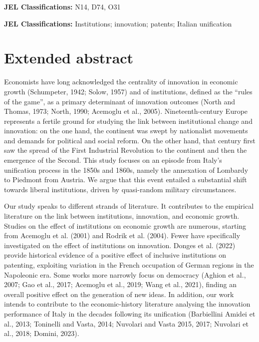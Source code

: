 \textbf{JEL Classifications:} N14, D74, O31 %

\textbf{JEL Classifications:} Institutions; innovation; patents; Italian unification

\clearpage

\section*{Extended abstract}
\noindent Economists have long acknowledged the centrality of innovation in economic growth (Schumpeter, 1942; Solow, 1957) and of institutions, defined as the “rules of the game”, as a primary determinant of innovation outcomes (North and Thomas, 1973; North, 1990; Acemoglu et al., 2005). %
Nineteenth-century Europe represents a fertile ground for studying the link between institutional change and innovation: on the one hand, the continent was swept by nationalist movements and demands for political and social reform. On the other hand, that century first saw the spread of the First Industrial Revolution to the continent and then the emergence of the Second. This study focuses on an episode from Italy’s unification process in the 1850s and 1860s, namely the annexation of Lombardy to Piedmont from Austria. We argue that this event entailed a substantial shift towards liberal institutions, driven by quasi-random military circumstances. %

Our study speaks to different strands of literature. It contributes to the empirical literature on the link between institutions, innovation, and economic growth. Studies on the effect of institutions on economic growth are numerous, starting from Acemoglu et al. (2001) and Rodrik et al. (2004). Fewer have specifically investigated on the effect of institutions on innovation. Donges et al. (2022) provide historical evidence of a positive effect of inclusive institutions on patenting, exploiting variation in the  French occupation of German regions in the Napoleonic era. Some works more narrowly focus on democracy (Aghion et al., 2007; Gao et al., 2017; Acemoglu et al., 2019; Wang et al., 2021), finding an overall positive effect on the generation of new ideas. In addition, our work intends to contribute to the economic-history literature analysing the innovation performance of Italy in the decades following its unification (Barbiellini Amidei et al., 2013; Toninelli and Vasta, 2014; Nuvolari and Vasta 2015, 2017; Nuvolari et al., 2018; Domini, 2023).

